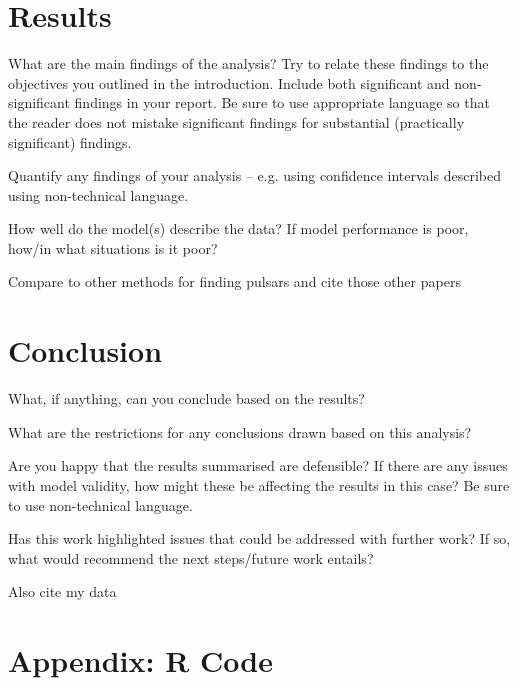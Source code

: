 \documentclass[11pt, oneside]{article}
\begin{document}
\section{Results}

What are the main findings of the analysis? Try to relate these findings to the objectives you outlined in the introduction. Include both significant and non-significant findings in your report. Be sure to use appropriate language so that the reader does not mistake significant findings for substantial (practically significant) findings.

Quantify any findings of your analysis – e.g. using confidence intervals described using non-technical language.

How well do the model(s) describe the data? If model performance is poor, how/in what situations is it poor?

Compare to other methods for finding pulsars and cite those other papers 

\section{Conclusion}

What, if anything, can you conclude based on the results? 

What are the restrictions for any conclusions drawn based on this analysis?

Are you happy that the results summarised are defensible? If there are any issues with model validity, how might these be affecting the results in this case? Be sure to use non-technical language.

Has this work highlighted issues that could be addressed with further work? If so, what would recommend the next steps/future work entails?

\begin{thebibliography}{9}

 
{\color{red}Also cite my data }
 
\end{thebibliography}

\section*{Appendix: R Code}
\end{document}
